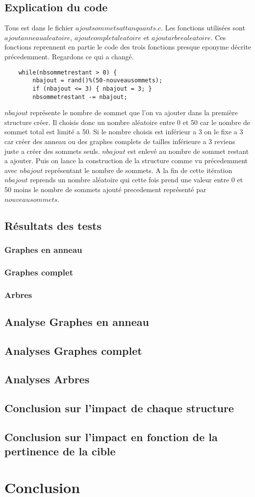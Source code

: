\documentclass[a4paper,11pt]{article}
\begin{document}
	\subsection{Explication du code}
		Tous est dans le fichier $ajoutsommetsattanquants.c$. Les fonctions utilisées sont $ajoutanneaualeatoire$, $ajoutcompletaleatoire$
		et $ajoutarbrealeatoire$. Ces fonctions reprennent en partie le code des trois fonctions presque eponyme décrite précedemment.
		Regardons ce qui a changé. 
		\begin{lstlisting}
	while(nbsommetrestant > 0) {
		nbajout = rand()%(50-nouveausommets);
		if (nbajout <= 3) { nbajout = 3; }
		nbsommetrestant -= nbajout;
		\end{lstlisting}
		$nbajout$ représente le nombre de sommet que l'on va ajouter dans la première structure créer. Il choisis donc un nombre 
		aléatoire entre 0 et 50 car le nombre de sommet total est limité a 50. Si le nombre choisis est inférieur a 3 on le fixe a 3 car créer
		des anneau ou des graphes complets de tailles inférieure a 3 reviens juste a créer des sommets seuls.
		$nbajout$ est enlevé au nombre de sommet restant a ajouter. Puis on lance la construction de la structure comme vu précedemment 
		avec $nbajout$ représentant le nombre de sommets. A la fin de cette itération $nbajout$ reprends un nombre aléatoire qui cette fois
		prend une valeur entre 0 et 50 moins le nombre de sommets ajouté precedement représenté par $nouveausommets$.
	\subsection{Résultats des tests}
		\subsubsection{Graphes en anneau}
		\subsubsection{Graphes complet}
		\subsubsection{Arbres}


	\subsection{Analyse Graphes en anneau}
		
	\subsection{Analyses Graphes complet}
	\subsection{Analyses Arbres}
	\subsection{Conclusion sur l'impact de chaque structure}
	\subsection{Conclusion sur l'impact en fonction de la pertinence de la cible}

\section{Conclusion}
\end{document}
